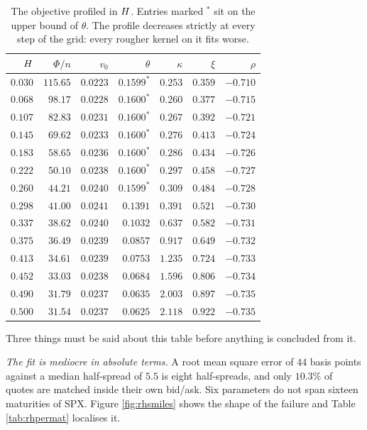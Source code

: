 \begin{table}[H]
\centering
\small
\begin{tabular}{rrrrrrr}
\hline
$H$ & $\Phi/n$ & $v_{0}$ & $\theta$ & $\kappa$ & $\xi$ & $\rho$\\
\hline
$0.030$ & $115.65$ & $0.0223$ & $0.1599^{*}$ & $0.253$ & $0.359$ & $-0.710$\\
$0.068$ & $\;98.17$ & $0.0228$ & $0.1600^{*}$ & $0.260$ & $0.377$ & $-0.715$\\
$0.107$ & $\;82.83$ & $0.0231$ & $0.1600^{*}$ & $0.267$ & $0.392$ & $-0.721$\\
$0.145$ & $\;69.62$ & $0.0233$ & $0.1600^{*}$ & $0.276$ & $0.413$ & $-0.724$\\
$0.183$ & $\;58.65$ & $0.0236$ & $0.1600^{*}$ & $0.286$ & $0.434$ & $-0.726$\\
$0.222$ & $\;50.10$ & $0.0238$ & $0.1600^{*}$ & $0.297$ & $0.458$ & $-0.727$\\
$0.260$ & $\;44.21$ & $0.0240$ & $0.1599^{*}$ & $0.309$ & $0.484$ & $-0.728$\\
$0.298$ & $\;41.00$ & $0.0241$ & $0.1391$ & $0.391$ & $0.521$ & $-0.730$\\
$0.337$ & $\;38.62$ & $0.0240$ & $0.1032$ & $0.637$ & $0.582$ & $-0.731$\\
$0.375$ & $\;36.49$ & $0.0239$ & $0.0857$ & $0.917$ & $0.649$ & $-0.732$\\
$0.413$ & $\;34.61$ & $0.0239$ & $0.0753$ & $1.235$ & $0.724$ & $-0.733$\\
$0.452$ & $\;33.03$ & $0.0238$ & $0.0684$ & $1.596$ & $0.806$ & $-0.734$\\
$0.490$ & $\;31.79$ & $0.0237$ & $0.0635$ & $2.003$ & $0.897$ & $-0.735$\\
$0.500$ & $\;\mathbf{31.54}$ & $0.0237$ & $0.0625$ & $2.118$ & $0.922$ & $-0.735$\\
\hline
\end{tabular}
\caption[The objective profiled in the Hurst index]{The objective profiled in $H$. Entries marked $^{*}$ sit on the upper bound of
$\theta$. The profile decreases strictly at every step of the grid: every rougher kernel on it
fits worse.}
\label{tab:rhprofile}
\end{table}


\vspace{-0.5cm}


Three things must be said about this table before anything is concluded from it.

\emph{The fit is mediocre in absolute terms.} A root mean square error of $44$ basis points against a
median half-spread of $5.5$ is eight half-spreads, and only $10.3\%$ of quotes are matched inside their
own bid/ask. Six parameters do not span sixteen maturities of SPX. Figure \ref{fig:rhsmiles} shows
the shape of the failure and Table \ref{tab:rhpermat} localises it.

